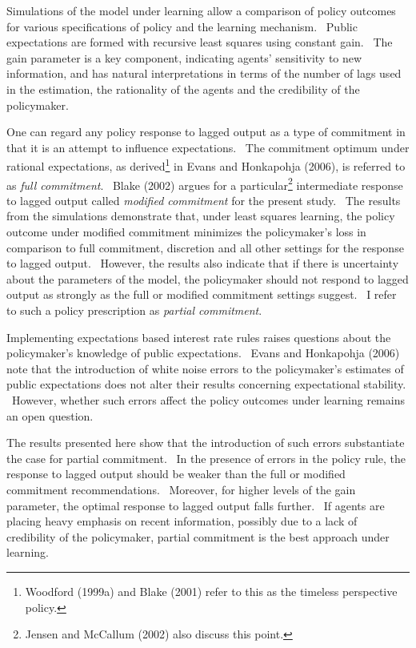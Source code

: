 \documentclass{article}
\begin{document}
\begin{doublespace}
Simulations of the model under learning allow a comparison of policy
outcomes for various specifications of policy and the learning mechanism. \
Public expectations are formed with recursive least squares using constant
gain. \ The gain parameter is a key component, indicating agents'
sensitivity to new information, and has natural interpretations in terms of
the number of lags used in the estimation, the rationality of the agents and
the credibility of the policymaker.

One can regard any policy response to lagged output as a type of commitment
in that it is an attempt to influence expectations. \ The commitment optimum
under rational expectations, as derived\footnote{%
Woodford (1999a) and Blake (2001) refer to this as the timeless perspective
policy.} in Evans and Honkapohja (2006), is referred to as \textit{full
commitment}. \ Blake (2002) argues for a particular\footnote{%
Jensen and McCallum (2002) also discuss this point.} intermediate response
to lagged output called \textit{modified commitment }for the present study.
\ The results from the simulations demonstrate that, under least squares
learning, the policy outcome under modified commitment minimizes the
policymaker's loss in comparison to full commitment, discretion and all
other settings for the response to lagged output. \ However, the results
also indicate that if there is uncertainty about the parameters of the
model, the policymaker should not respond to lagged output as strongly as
the full or modified commitment settings suggest. \ I refer to such a policy
prescription as \textit{partial commitment}.

Implementing expectations based interest rate rules raises questions about
the policymaker's knowledge of public expectations. \ Evans and Honkapohja
(2006) note that the introduction of white noise errors to the policymaker's
estimates of public expectations does not alter their results concerning
expectational stability. \ However, whether such errors affect the policy
outcomes under learning remains an open question.

The results presented here show that the introduction of such errors
substantiate the case for partial commitment. \ In the presence of errors in
the policy rule, the response to lagged output should be weaker than the
full or modified commitment recommendations. \ Moreover, for higher levels
of the gain parameter, the optimal response to lagged output falls further.
\ If agents are placing heavy emphasis on recent information, possibly due
to a lack of credibility of the policymaker, partial commitment is the best
approach under learning.


\end{doublespace}
\end{document}
